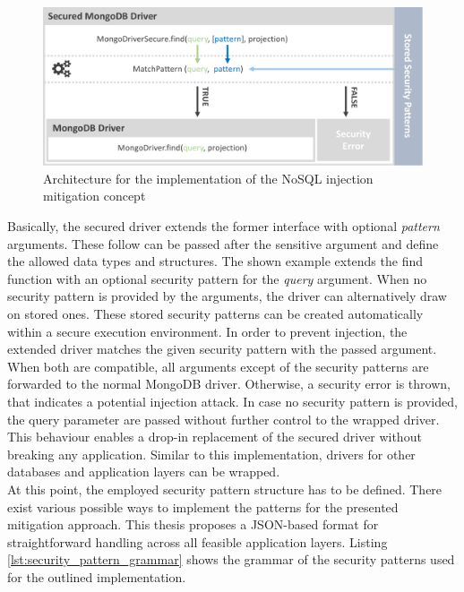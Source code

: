 \begin{figure}[h]
\centering
  \includegraphics[width=1\linewidth]{Images/secure_driver}
  \caption{Architecture for the implementation of the NoSQL injection mitigation concept}
  \label{fig:architecture_secure_driver}
\end{figure}

Basically, the secured driver extends the former interface with optional \emph{pattern} arguments. These follow can be passed after the sensitive argument and define the allowed data types and structures. The shown example extends the find function with an optional security pattern for the \emph{query} argument. When no security pattern is provided by the arguments, the driver can alternatively draw on stored ones. These stored security patterns can be created automatically within a secure execution environment. In order to prevent injection, the extended driver matches the given security pattern with the passed argument. When both are compatible, all arguments except of the security patterns are forwarded to the normal MongoDB driver. Otherwise, a security error is thrown, that indicates a potential injection attack. In case no security pattern is provided, the query parameter are passed without further control to the wrapped driver. This behaviour enables a drop-in replacement of the secured driver without breaking any application. Similar to this implementation, drivers for other databases and application layers can be wrapped. \\

At this point, the employed security pattern structure has to be defined. There exist various possible ways to implement the patterns for the presented mitigation approach. This thesis proposes a JSON-based format for straightforward handling across all feasible application layers. Listing \ref{lst:security_pattern_grammar} shows the grammar of the security patterns used for the outlined implementation. \\

